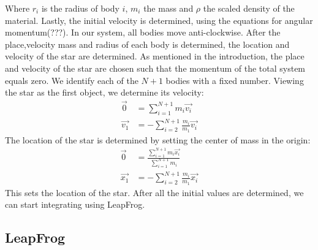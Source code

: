 Where \(r_i\) is the radius of body \(i\), \(m_i\) the mass and \(\rho\) the scaled density of the material.
Lastly, the initial velocity is determined, using the equations for angular momentum(???). 
In our system, all bodies move anti-clockwise. 
After the place,velocity mass and radius of each body is determined, the location and velocity of the star are determined. 
As mentioned in the introduction, the place and velocity of the star are chosen such that the momentum of the total system equals zero.
We identify each of the \(N+1\) bodies with a fixed number. Viewing the star  as the first object, we determine its velocity:
\begin{align*}
	\vec{0}&=\sum_{i=1}^{N+1}m_i\vec{v_i}\\
	\vec{v_1}&=-\sum_{i=2}^{N+1}\frac{m_i}{m_1}\vec{v_i}
\end{align*}
The location of the star is determined by setting the center of mass in the origin:
\begin{align*}
	\vec{0}&=\frac{\sum_{i=1}^{N+1}m_i\vec{x_i}}{\sum_{i=1}^{N+1}m_i}\\
	\vec{x_1}&=-\sum_{i=2}^{N+1}\frac{m_i}{m_1}\vec{x_i}
\end{align*}
This sets the location of the star.
After all the initial values are determined, we can start integrating using LeapFrog.
\subsection{LeapFrog}

